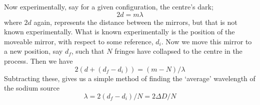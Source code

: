 		Now experimentally, say for a given configuration, the centre's dark;
		\begin{equation}
			2d=m\lambda
		\end{equation}
		where $2d$ again, represents the distance between the mirrors, but that is not known experimentally. What is known experimentally is the position of the moveable mirror, with respect to some reference, $d_i$.
		Now we move this mirror to a new position, say $d_f$, such that $N$ fringes have collapsed to the centre in the process. Then we have
		\begin{equation}
			2(d+ (d_f-d_i))=(m-N)/\lambda
		\end{equation}
		Subtracting these, gives us a simple method of finding the `average' wavelength of the sodium source
		\begin{equation}
			\lambda=2(d_f-d_i)/N=2\Delta D/N
			\label{5_eq1}
		\end{equation}


